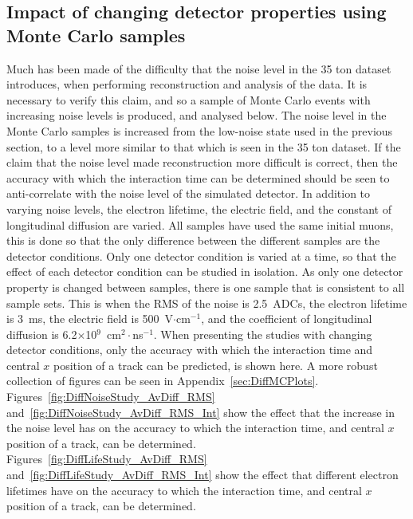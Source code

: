 \subsection{Impact of changing detector properties using Monte Carlo samples} \label{sec:DiffMCStudies}
Much has been made of the difficulty that the noise level in the 35 ton dataset introduces, when performing reconstruction and analysis of the data. It is necessary to verify this claim, and so a sample of Monte Carlo events with increasing noise levels is produced, and analysed below. The noise level in the Monte Carlo samples is increased from the low-noise state used in the previous section, to a level more similar to that which is seen in the 35 ton dataset. If the claim that the noise level made reconstruction more difficult is correct, then the accuracy with which the interaction time can be determined should be seen to anti-correlate with the noise level of the simulated detector. In addition to varying noise levels, the electron lifetime, the electric field, and the constant of longitudinal diffusion are varied. All samples have used the same initial muons, this is done so that the only difference between the different samples are the detector conditions. Only one detector condition is varied at a time, so that the effect of each detector condition can be studied in isolation. As only one detector property is changed between samples, there is one sample that is consistent to all sample sets. This is when the RMS of the noise is 2.5~ADCs, the electron lifetime is 3~ms, the electric field is 500~V$\cdot$cm$^{-1}$, and the coefficient of longitudinal diffusion is 6.2$\times$10$^9$~cm$^2\cdot$ns$^{-1}$. When presenting the studies with changing detector conditions, only the accuracy with which the interaction time and central $x$ position of a track can be predicted, is shown here. A more robust collection of figures can be seen in Appendix~\ref{sec:DiffMCPlots}. \\

Figures~\ref{fig:DiffNoiseStudy_AvDiff_RMS} and~\ref{fig:DiffNoiseStudy_AvDiff_RMS_Int} show the effect that the increase in the noise level has on the accuracy to which the interaction time, and central $x$ position of a track, can be determined. \\

Figures~\ref{fig:DiffLifeStudy_AvDiff_RMS} and~\ref{fig:DiffLifeStudy_AvDiff_RMS_Int} show the effect that different electron lifetimes have on the accuracy to which the interaction time, and central $x$ position of a track, can be determined. \\

